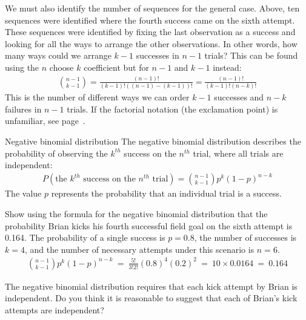 We must also identify the number of sequences for the general case. Above, ten sequences were identified where the fourth success came on the sixth attempt. These sequences were identified by fixing the last observation as a success and looking for all the ways to arrange the other observations. In other words, how many ways could we arrange $k-1$ successes in $n-1$ trials? This can be found using the $n$ choose $k$ coefficient but for $n-1$ and $k-1$ instead:
\begin{align*}
{n-1 \choose k-1} = \frac{(n-1)!}{(k-1)! \left((n-1) - (k-1)\right)!} = \frac{(n-1)!}{(k-1)! \left(n - k\right)!}
\end{align*}
This is the number of different ways we can order $k-1$ successes and $n-k$ failures in $n-1$ trials. If the factorial notation (the exclamation point) is unfamiliar, see page~\pageref{factorial_defined}.

\begin{onebox}{Negative binomial distribution}
  The negative binomial distribution describes the
  probability of observing the $k^{th}$ success on
  the $n^{th}$ trial, where all trials are independent:
  \begin{align*}
  P(\text{the $k^{th}$ success on the $n^{th}$ trial})
      = {n-1 \choose k-1} p^{k}(1-p)^{n-k}
  \end{align*}
  The value $p$ represents the probability that
  an individual trial is a success.
\end{onebox}

\begin{examplewrap}
\begin{nexample}{Show using the formula for the negative binomial distribution that the probability Brian kicks his fourth successful field goal on the sixth attempt is 0.164.}
The probability of a single success is $p=0.8$, the number of successes is $k=4$, and the number of necessary attempts under this scenario is $n=6$.
\begin{align*}
{n-1 \choose k-1}p^k(1-p)^{n-k}\ 
	=\ \frac{5!}{3!2!} (0.8)^4 (0.2)^2\ 
	=\ 10\times 0.0164\ 
	=\ 0.164
\end{align*}
\end{nexample}
\end{examplewrap}

\begin{exercisewrap}
\begin{nexercise}
The negative binomial distribution requires that each kick attempt by Brian is independent. Do you think it is reasonable to suggest that each of Brian's kick attempts are independent?\footnotemark
\end{nexercise}
\end{exercisewrap}

